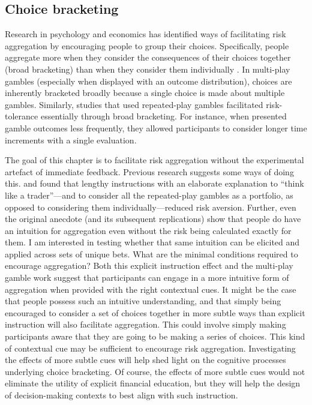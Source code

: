 \documentclass[a4paper, nobind, dvipsnames]{templates/ociamthesis}
\theoremstyle{definition}
\theoremstyle{definition}
\theoremstyle{definition}
\theoremstyle{definition}
\theoremstyle{remark}
\begin{document}
\subsection{Choice bracketing}

Research in psychology and economics has identified ways of facilitating risk
aggregation by encouraging people to group their choices. Specifically, people
aggregate more when they consider the consequences of their choices together
(broad bracketing) than when they consider them individually \autocite[narrow bracketing;][]{read1999}. In multi-play gambles (especially when displayed with an outcome
distribution), choices are inherently bracketed broadly because a single choice
is made about multiple gambles. Similarly, studies that used repeated-play
gambles facilitated risk-tolerance essentially through broad bracketing. For
instance, when \textcite{thaler1997} presented gamble outcomes less frequently, they
allowed participants to consider longer time increments with a single
evaluation.

The goal of this chapter is to facilitate risk aggregation without the
experimental artefact of immediate feedback. Previous research suggests some
ways of doing this. \textcite{sokolhessner2009} and \textcite{sokolhessner2012} found that lengthy
instructions with an elaborate explanation to ``think like a trader''---and to
consider all the repeated-play gambles as a portfolio, as opposed to considering
them individually---reduced risk aversion. Further, even the original
\textcite{samuelson1963} anecdote (and its subsequent replications) show that people do
have an intuition for aggregation even without the risk being calculated exactly
for them. I am interested in testing whether that same intuition can be elicited
and applied across sets of unique bets. What are the minimal conditions required
to encourage aggregation? Both this explicit instruction effect and the
multi-play gamble work suggest that participants can engage in a more intuitive
form of aggregation when provided with the right contextual cues. It might be
the case that people possess such an intuitive understanding, and that simply
being encouraged to consider a set of choices together in more subtle ways than
explicit instruction will also facilitate aggregation. This could involve simply
making participants aware that they are going to be making a series of choices.
This kind of contextual cue may be sufficient to encourage risk aggregation.
Investigating the effects of more subtle cues will help shed light on the
cognitive processes underlying choice bracketing. Of course, the effects of more
subtle cues would not eliminate the utility of explicit financial education, but
they will help the design of decision-making contexts to best align with such
instruction.
\end{document}
